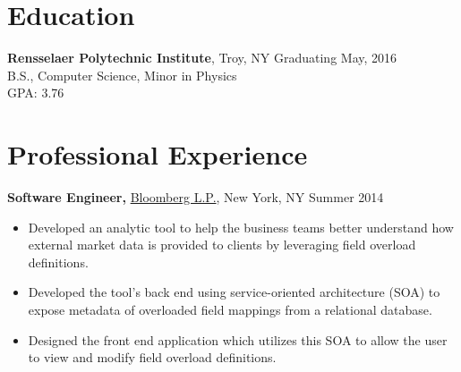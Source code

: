 \documentclass[margin]{res}
\begin{document}
 

 
\address{{\bf Present Address} \\ 2166 14th St \\ 2nd Floor \\ Troy, NY 12180 }
\address{{\bf Permanent Address} \\ 4 Oak Street \\ Cumberland, ME 04021 }
\begin{resume} 
 
\section{Education} 
{\bf Rensselaer Polytechnic Institute}, Troy, NY \hfill Graduating May, 2016 \\
B.S., Computer Science, Minor in Physics \\
GPA: 3.76
 

\section{Professional Experience}
{\bf Software Engineer,} \uline{Bloomberg L.P.}, New York, NY \hfill Summer 2014
 \begin{itemize} \itemsep -2pt
 \item Developed an analytic tool to help the business teams better understand how external market data is provided to clients by leveraging field overload definitions.
 \item Developed the tool's back end using service-oriented architecture (SOA) to expose metadata of overloaded field mappings from a relational database.
 \item Designed the front end application which utilizes this SOA to allow the user to view and modify field overload definitions.
 \end{itemize}




\end{resume}
\end{document}
